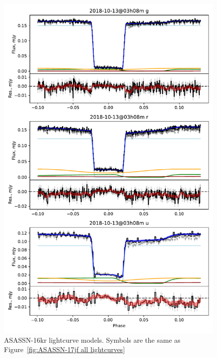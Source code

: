 \begin{figure}
    \centering
    \includegraphics[width=\textwidth]{figures/results/three_cvs_with_weird_colours/ASASSN-16kr/ASASSN-16kr_1.pdf}
    \caption{ASASSN-16kr lightcurve models. Symbols are the same as Figure~\ref{fig:ASASSN-17jf all lightcurves}}
    \label{fig:ASASSN-16kr all lightcurves}
\end{figure}
